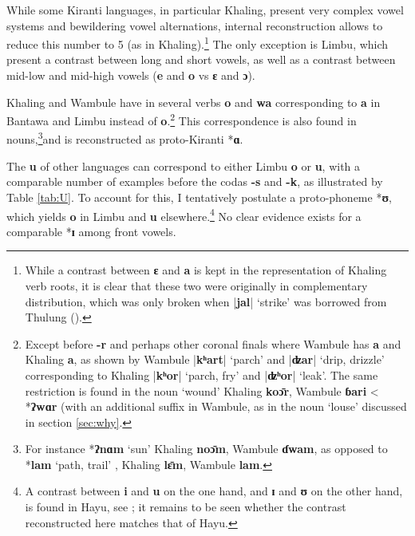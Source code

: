 \documentclass[oneside,a4paper,11pt]{article}
\newcommand{\ipa}[1]{\textbf{{\phon\mbox{#1}}}} %
\newcommand{\dhatu}[2]{|\ipa{#1}| `#2'}
\begin{document}
While some Kiranti languages, in particular Khaling, present very complex vowel systems and bewildering vowel alternations, internal reconstruction allows to reduce this number to 5 (as in Khaling).\footnote{While a contrast between \ipa{ɛ} and \ipa{a} is kept in the representation of Khaling verb roots, it is clear that these two were originally in complementary distribution, which was only broken when \dhatu{jal}{strike} was borrowed from Thulung (\citealt[1110]{jacques12khaling}).} The only exception is Limbu, which present a contrast between long and short vowels, as well as a contrast between mid-low and mid-high vowels (\ipa{e} and \ipa{o} vs \ipa{ɛ} and \ipa{ɔ}).  

Khaling and Wambule have in several verbs \ipa{o} and \ipa{wa} corresponding to \ipa{a} in Bantawa and Limbu instead of \ipa{o}.\footnote{Except before \ipa{-r} and perhaps other coronal finals where Wambule has \ipa{a} and Khaling \ipa{a}, as shown by Wambule \dhatu{kʰart}{parch}	 	
and \dhatu{ʣar}{drip, drizzle}	corresponding to Khaling 	\dhatu{kʰor}{parch, fry} and \dhatu{ʣʰor}{leak}. The same restriction is found in the noun `wound' Khaling \ipa{koɔ̄r}, Wambule \ipa{ɓari} < *\ipa{ʔwɑr} (with an additional suffix in Wambule, as in the noun `louse' discussed in section \ref{sec:why}.} This correspondence is also found in nouns,\footnote{For instance *\ipa{ʔnɑm} `sun'  Khaling \ipa{noɔ̄m}, Wambule \ipa{ɗwam}, as opposed to *\ipa{lam} `path, trail' , Khaling \ipa{lɛ̄m}, Wambule \ipa{lam}.}and is reconstructed as proto-Kiranti *\ipa{ɑ}.

The \ipa{u} of other languages can correspond to either Limbu \ipa{o} or \ipa{u}, with a comparable number of examples before the codas \ipa{-s} and \ipa{-k}, as illustrated by Table \ref{tab:U}. To account for this, I tentatively postulate a proto-phoneme *\ipa{ʊ}, which yields \ipa{o} in Limbu and \ipa{u} elsewhere.\footnote{A contrast between \ipa{i} and \ipa{u} on the one hand, and \ipa{ɪ} and \ipa{ʊ} on the other hand, is found in Hayu, see \citet{michailovsky88}; it remains to be seen whether the contrast reconstructed here matches that of Hayu. } No clear evidence exists for a comparable *\ipa{ɪ} among front vowels.
\end{document}
